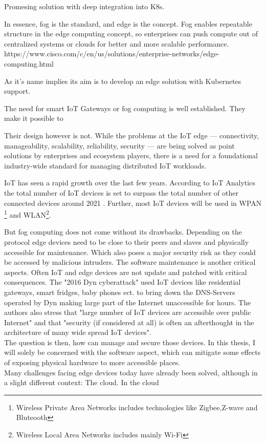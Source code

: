 {Promesing solution with deep integration into K8s.


In essence, fog is the standard, and edge is the concept. Fog enables repeatable structure in the edge computing concept, so enterprises can push compute out of centralized systems or clouds for better and more scalable performance.
https://www.cisco.com/c/en/us/solutions/enterprise-networks/edge-computing.html


As it's name implies its aim is to develop an edge solution with Kubernetes support.

The need for smart IoT Gateways or fog computing is well established. They make it possible to 

Their design however is not. 
While the problems at the IoT edge — connectivity, manageability, scalability, reliability, security — are being solved as point solutions by enterprises and ecosystem players, there is a need for a foundational industry-wide standard for managing distributed IoT workloads.





IoT has seen a rapid growth over the last few years. According to IoT Analytics the total number of IoT devices is set to surpass the total number of other connected devices around 2021 \cite{StateofIoT:online}. Further, most IoT devices will be used in WPAN \footnote{Wireless Private Area Networks includes technologies like Zigbee,Z-wave and Bluteooth} and WLAN\footnote{Wireless Local Area Networks includes mainly Wi-Fi}. 


But fog computing does not come without its drawbacks. Depending on the protocol edge devices need to be close to their peers and slaves and physically accessible for maintenance. Which also poses a major security risk as they could be accessed by malicious intruders. The software maintenance is another critical aspects. Often IoT and edge devices are not update and patched with critical consequences. The "2016 Dyn cyberattack" used IoT devices like residential gateways, smart fridges, baby phones ect. to bring down the DNS-Servers operated by Dyn making large part of the Internet unaccessible for hours\cite{dynAttack}. The authors also stress that "large number of IoT devices are accessible over public Internet" and that "security (if considered at all) is often an afterthought in the architecture of many wide spread IoT devices"\cite{dynAttack}.\\
The question is then, how can manage and secure those devices. In this thesis, I will solely be concerned with the software aspect, which can mitigate some effects of exposing physical hardware to more accessible places.\\
Many challenges facing edge devices today have already been solved, although in a slight different context: The cloud\cite{IntroducingDejanBosanac:KubernetesIoTEdgeWorkingGroup}. In the cloud 




}
